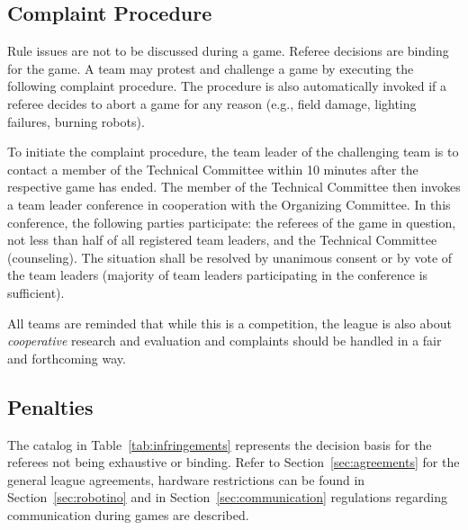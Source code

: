 \documentclass[12pt,twoside]{article}
\newcommand{\refsec}[1]{Section~\ref{#1}}
\newcommand{\reftab}[1]{Table~\ref{#1}}
\begin{document}
\subsection{Complaint Procedure}
Rule issues are not to be discussed during a game. Referee decisions
are binding for the game. A team may protest and challenge a game by
executing the following complaint procedure. The procedure is also
automatically invoked if a referee decides to abort a game for any
reason (e.g., field damage, lighting failures, burning robots).

To initiate the complaint procedure, the team leader of the
challenging team is to contact a member of the Technical Committee
within 10 minutes after the respective game has ended. The member of
the Technical Committee then invokes a team leader conference in
cooperation with the Organizing Committee. In this conference, the
following parties participate: the referees of the game in question,
not less than half of all registered team leaders, and the Technical
Committee (counseling). The situation shall be resolved by unanimous
consent or by vote of the team leaders (majority of team leaders
participating in the conference is sufficient).

All teams are reminded that while this is a competition, the league is
also about \emph{cooperative} research and evaluation and complaints
should be handled in a fair and forthcoming way.

\subsection{Penalties}
The catalog in \reftab{tab:infringements} represents the decision
basis for the referees not being exhaustive or binding.
Refer to \refsec{sec:agreements} for the general league agreements,
hardware restrictions can be found in \refsec{sec:robotino} and
in \refsec{sec:communication} regulations regarding communication
during games are described.
%
\end{document}

